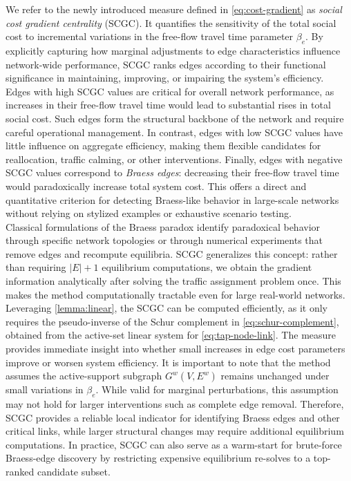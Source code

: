 \documentclass[twocolumn,english,groupedaddress, superscriptaddress,aps,pre,10pt,floatfix]{revtex4-2}
\begin{document}
We refer to the newly introduced measure defined in \cref{eq:cost-gradient} as \textit{social cost gradient centrality} (SCGC). It quantifies the sensitivity of the total social cost to incremental variations in the free-flow travel time parameter $\beta_e$. By explicitly capturing how marginal adjustments to edge characteristics influence network-wide performance, SCGC ranks edges according to their functional significance in maintaining, improving, or impairing the system’s efficiency.\\

Edges with high SCGC values are critical for overall network performance, as increases in their free-flow travel time would lead to substantial rises in total social cost. Such edges form the structural backbone of the network and require careful operational management. In contrast, edges with low SCGC values have little influence on aggregate efficiency, making them flexible candidates for reallocation, traffic calming, or other interventions. Finally, edges with negative SCGC values correspond to \textit{Braess edges}: decreasing their free-flow travel time would paradoxically increase total system cost. This offers a direct and quantitative criterion for detecting Braess-like behavior in large-scale networks without relying on stylized examples or exhaustive scenario testing.\\

Classical formulations of the Braess paradox \cite{braess1968paradoxon} identify paradoxical behavior through specific network topologies or through numerical experiments that remove edges and recompute equilibria. SCGC generalizes this concept: rather than requiring $|E|+1$ equilibrium computations, we obtain the gradient information analytically after solving the traffic assignment problem once. This makes the method computationally tractable even for large real-world networks.\\

Leveraging \cref{lemma:linear}, the SCGC can be computed efficiently, as it only requires the pseudo-inverse of the Schur complement in \cref{eq:schur-complement}, obtained from the active-set linear system for \cref{eq:tap-node-link}. The measure provides immediate insight into whether small increases in edge cost parameters improve or worsen system efficiency. It is important to note that the method assumes the active-support subgraph $G^w(V,E^w)$ remains unchanged under small variations in $\beta_e$. While valid for marginal perturbations, this assumption may not hold for larger interventions such as complete edge removal. Therefore, SCGC provides a reliable local indicator for identifying Braess edges and other critical links, while larger structural changes may require additional equilibrium computations. In practice, SCGC can also serve as a warm-start for brute-force Braess-edge discovery by restricting expensive equilibrium re-solves to a top-ranked candidate subset.
\end{document}
